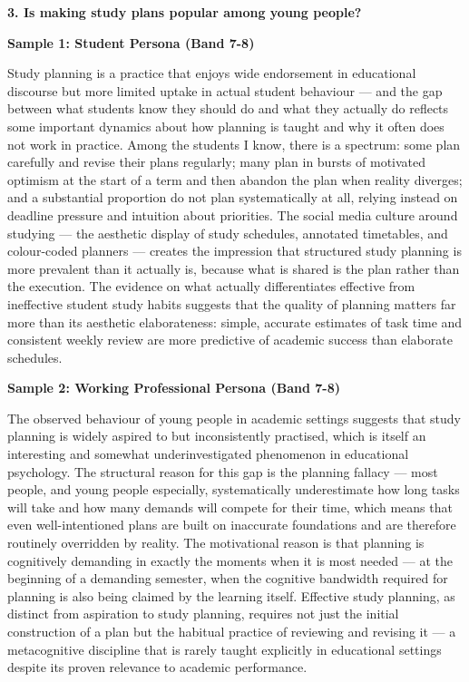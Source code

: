 \separator

\begin{ieltsquestion}
\textbf{3. Is making study plans popular among young people?}
\end{ieltsquestion}
\textbf{Sample 1: Student Persona (Band 7-8)}

Study planning is a practice that enjoys wide endorsement in educational discourse but more limited uptake in actual student behaviour — and the gap between what students know they should do and what they actually do reflects some important dynamics about how planning is taught and why it often does not work in practice. Among the students I know, there is a spectrum: some plan carefully and revise their plans regularly; many plan in bursts of motivated optimism at the start of a term and then abandon the plan when reality diverges; and a substantial proportion do not plan systematically at all, relying instead on deadline pressure and intuition about priorities. The social media culture around studying — the aesthetic display of study schedules, annotated timetables, and colour-coded planners — creates the impression that structured study planning is more prevalent than it actually is, because what is shared is the plan rather than the execution. The evidence on what actually differentiates effective from ineffective student study habits suggests that the quality of planning matters far more than its aesthetic elaborateness: simple, accurate estimates of task time and consistent weekly review are more predictive of academic success than elaborate schedules.

\textbf{Sample 2: Working Professional Persona (Band 7-8)}

The observed behaviour of young people in academic settings suggests that study planning is widely aspired to but inconsistently practised, which is itself an interesting and somewhat underinvestigated phenomenon in educational psychology. The structural reason for this gap is the planning fallacy — most people, and young people especially, systematically underestimate how long tasks will take and how many demands will compete for their time, which means that even well-intentioned plans are built on inaccurate foundations and are therefore routinely overridden by reality. The motivational reason is that planning is cognitively demanding in exactly the moments when it is most needed — at the beginning of a demanding semester, when the cognitive bandwidth required for planning is also being claimed by the learning itself. Effective study planning, as distinct from aspiration to study planning, requires not just the initial construction of a plan but the habitual practice of reviewing and revising it — a metacognitive discipline that is rarely taught explicitly in educational settings despite its proven relevance to academic performance.

